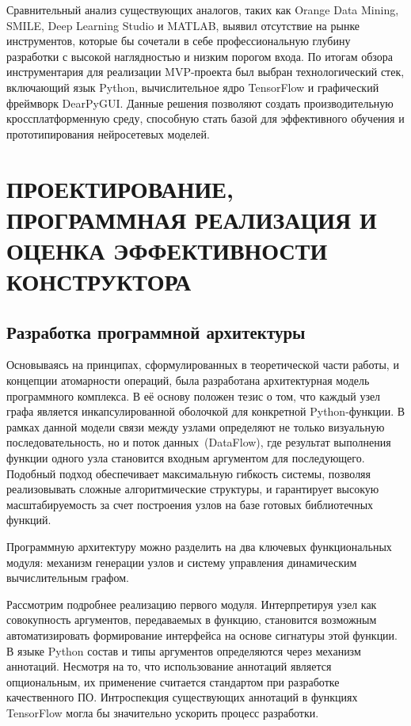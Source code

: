 \documentclass{report}
\begin{document}
Сравнительный анализ существующих аналогов, таких как Orange Data Mining, SMILE, Deep Learning Studio и MATLAB, выявил отсутствие на рынке инструментов, которые бы сочетали в себе профессиональную глубину разработки с высокой наглядностью и низким порогом входа. По итогам обзора инструментария для реализации MVP-проекта был выбран технологический стек, включающий язык Python, вычислительное ядро TensorFlow и графический фреймворк DearPyGUI. Данные решения позволяют создать производительную кроссплатформенную среду, способную стать базой для эффективного обучения и прототипирования нейросетевых моделей.


\chapter{ПРОЕКТИРОВАНИЕ, ПРОГРАММНАЯ РЕАЛИЗАЦИЯ И ОЦЕНКА ЭФФЕКТИВНОСТИ КОНСТРУКТОРА}
\setcounter{section}{0}
\setcounter{subsection}{0}
\setcounter{equation}{0}

\section{Разработка программной архитектуры}

Основываясь на принципах, сформулированных в теоретической части работы, и концепции атомарности операций, была разработана архитектурная модель программного комплекса. В её основу положен тезис о том, что каждый узел графа является инкапсулированной оболочкой для конкретной Python-функции. В рамках данной модели связи между узлами определяют не только визуальную последовательность, но и поток данных~(DataFlow), где результат выполнения функции одного узла становится входным аргументом для последующего. Подобный подход обеспечивает максимальную гибкость системы, позволяя реализовывать сложные алгоритмические структуры, и гарантирует высокую масштабируемость за счет построения узлов на базе готовых библиотечных функций.

Программную архитектуру можно разделить на два ключевых функциональных модуля: механизм генерации узлов и систему управления динамическим вычислительным графом.

Рассмотрим подробнее реализацию первого модуля. Интерпретируя узел как совокупность аргументов, передаваемых в функцию, становится возможным автоматизировать формирование интерфейса на основе сигнатуры этой функции. В языке Python состав и типы аргументов определяются через механизм аннотаций. Несмотря на то, что использование аннотаций является опциональным, их применение считается стандартом при разработке качественного ПО. Интроспекция существующих аннотаций в функциях TensorFlow могла бы значительно ускорить процесс разработки.
\end{document}
